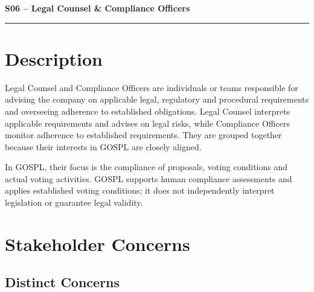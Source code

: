 \documentclass[11pt,a4paper]{article}
\begin{document}

{\LARGE\bfseries S06 -- Legal Counsel \& Compliance Officers\par}\vspace{1em}
\noindent\rule{\linewidth}{0.4pt}

\section*{Description}

Legal Counsel and Compliance Officers are individuals or teams responsible for advising the company on applicable legal, regulatory and procedural requirements and overseeing adherence to established obligations. Legal Counsel interprets applicable requirements and advises on legal risks, while Compliance Officers monitor adherence to established requirements. They are grouped together because their interests in GOSPL are closely aligned.

In GOSPL, their focus is the compliance of proposals, voting conditions and actual voting activities. GOSPL supports human compliance assessments and applies established voting conditions; it does not independently interpret legislation or guarantee legal validity.

\section*{Stakeholder Concerns}

\subsection*{Distinct Concerns}
\end{document}
